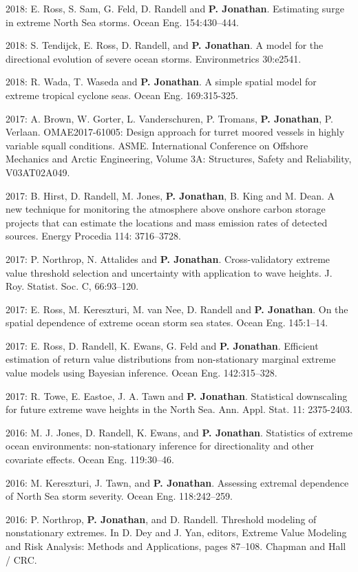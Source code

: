 \documentclass[11pt,a4paper]{moderncv}
\begin{document}
2018: E. Ross, S. Sam, G. Feld, D. Randell and \textbf{P. Jonathan}. Estimating surge in extreme North Sea storms. Ocean Eng. 154:430--444.

2018: S. Tendijck, E. Ross, D. Randell, and \textbf{P. Jonathan}. A model for the directional evolution of severe ocean storms. Environmetrics 30:e2541.

2018: R. Wada, T. Waseda and \textbf{P. Jonathan}. A simple spatial model for extreme tropical cyclone seas.  Ocean Eng. 169:315-325.

2017: A. Brown, W. Gorter, L. Vanderschuren, P. Tromans, \textbf{P. Jonathan}, P. Verlaan. OMAE2017-61005: Design approach for turret moored vessels in highly variable squall conditions. ASME. International Conference on Offshore Mechanics and Arctic Engineering, Volume 3A: Structures, Safety and Reliability, V03AT02A049.

2017: B. Hirst, D. Randell, M. Jones, \textbf{P. Jonathan}, B. King and M. Dean. A new technique for monitoring the atmosphere above onshore carbon storage projects that can estimate the locations and mass emission rates of detected sources.  Energy Procedia 114: 3716--3728.

2017: P. Northrop, N. Attalides and \textbf{P. Jonathan}. Cross-validatory extreme value threshold selection and uncertainty with application to wave heights. J. Roy. Statist. Soc. C, 66:93--120.

2017: E. Ross, M. Kereszturi, M. van Nee, D. Randell and \textbf{P. Jonathan}. On the spatial dependence of extreme ocean storm sea states. Ocean Eng. 145:1--14.

2017: E. Ross, D. Randell, K. Ewans, G. Feld and \textbf{P. Jonathan}. Efficient estimation of return value distributions from non-stationary marginal extreme value models using Bayesian inference. Ocean Eng. 142:315--328.

2017: R. Towe, E. Eastoe, J. A. Tawn and \textbf{P. Jonathan}. Statistical downscaling for future extreme wave heights in the North Sea. Ann. Appl. Stat. 11: 2375-2403.

2016: M. J. Jones, D. Randell, K. Ewans, and \textbf{P. Jonathan}. Statistics of extreme ocean environments: non-stationary inference for directionality and other covariate effects. Ocean Eng. 119:30--46.

2016: M. Kereszturi, J. Tawn, and \textbf{P. Jonathan}. Assessing extremal dependence of North Sea storm severity. Ocean Eng. 118:242--259.

2016: P. Northrop, \textbf{P. Jonathan}, and D. Randell. Threshold modeling of nonstationary extremes. In D. Dey and J. Yan, editors, Extreme Value Modeling and Risk Analysis: Methods and Applications, pages 87--108. Chapman and Hall / CRC.
\end{document}
